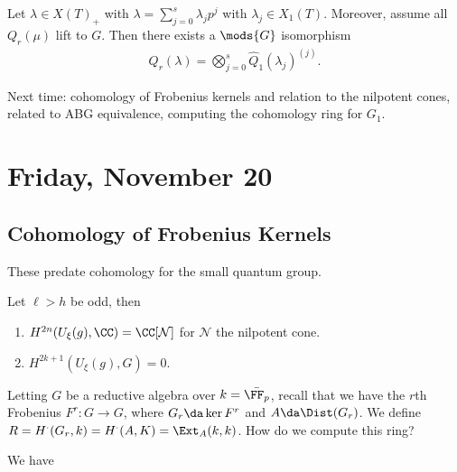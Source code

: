 \begin{corollary}[?]

Let \(\lambda \in X(T)_+\) with \(\lambda = \sum_{j=0}^s \lambda_j p^j\)
with \(\lambda_j \in X_1(T)\). Moreover, assume all \(Q_r(\mu)\) lift to
\(G\). Then there exists a \(\mods{G}\) isomorphism
\begin{align*}  
Q_r(\lambda) = \bigotimes_{j=0}^s \hat Q_1(\lambda_j)^{(j)}
.\end{align*}

\end{corollary}

Next time: cohomology of Frobenius kernels and relation to the nilpotent
cones, related to ABG equivalence, computing the cohomology ring for
\(G_1\).

\hypertarget{friday-november-20}{%
\section{Friday, November 20}\label{friday-november-20}}

\hypertarget{cohomology-of-frobenius-kernels}{%
\subsection{Cohomology of Frobenius
Kernels}\label{cohomology-of-frobenius-kernels}}

These predate cohomology for the small quantum group.

\begin{theorem}

Let \(\ell > h\) be odd, then

\begin{enumerate}
\def\labelenumi{\arabic{enumi}.}
\item
  \(H^{2n}(U_\xi(g), \CC ) = \CC[\mathcal{N}]\) for \(\mathcal{N}\) the
  nilpotent cone.
\item
  \(H^{2k+1}(U_\xi(g), G) = 0\).
\end{enumerate}

\end{theorem}

Letting \(G\) be a reductive algebra over \(k = \bar{\FF_p}\), recall
that we have the \(r\)th Frobenius \(F^r:G\to G\), where
\(G_r \da \ker F^r\) and \(A \da \Dist(G_r)\). We define
\(R = H^\cdot(G_r, k) = H^\cdot(A, K) = \Ext_A(k, k)\). How do we
compute this ring?

We have

\begin{center}
\end{center}

